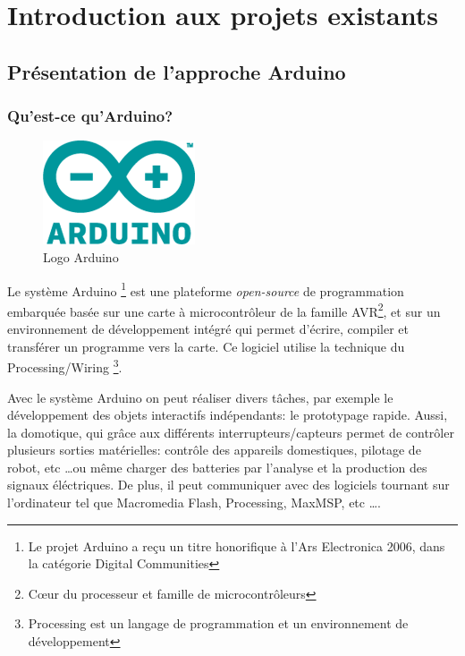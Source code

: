 \part{Introduction aux projets existants}
\chapter[Présentation de l’approche Arduino]{Présentation de l’approche Arduino}
\label{chap:chap2}

\section{Qu'est-ce qu'Arduino?}

\begin{figure}[h]
\begin{center}
\includegraphics[scale=0.4]{../images/Arduino/Arduinologo.png}
\caption{Logo Arduino}
\end{center}
\end{figure}

Le système Arduino \footnote{Le projet Arduino a reçu un titre honorifique à l'Ars Electronica 2006, dans la catégorie Digital Communities}
est une plateforme \textit{open-source} de programmation embarquée basée sur une carte à microcontrôleur de la famille AVR\footnote{
Cœur du processeur et famille de microcontrôleurs}, et sur un environnement
de développement intégré qui permet d'écrire, compiler et transférer un programme vers la carte. Ce logiciel utilise la technique du Processing/Wiring
\footnote{Processing est un langage de programmation et un environnement de développement}.

Avec le système Arduino on peut réaliser divers tâches, par exemple le développement des objets interactifs indépendants: le prototypage rapide. Aussi,
la domotique, qui grâce aux différents interrupteurs/capteurs permet de contrôler plusieurs sorties matérielles: contrôle des appareils domestiques,
pilotage de robot, etc \ldots ou même charger des batteries par l'analyse et la production des signaux éléctriques.
De plus, il peut communiquer avec des logiciels tournant sur l'ordinateur tel que Macromedia Flash, Processing, MaxMSP, etc \ldots.

